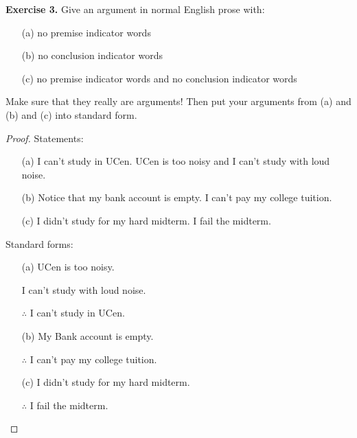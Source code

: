 \documentclass{article}
\begin{document}
\pagebreak

\begin{ques}\label{q3}
\textbf{Exercise 3.} Give an argument in normal English prose with:

\begin{enumerate}
\item[(a)] no premise indicator words
\item[(b)] no conclusion indicator words
\item[(c)] no premise indicator words and no conclusion indicator words
\end{enumerate}

Make sure that they really are arguments! Then put your arguments from (a) and (b) and (c) into standard form.
\end{ques}

\begin{proof}

    Statements:

    \begin{itemize}
        \item[(a)] I can't study in UCen. UCen is too noisy and I can't study with loud noise.
        \item[(b)] Notice that my bank account is empty. I can't pay my college tuition.
        \item[(c)] I didn't study for my hard midterm. I fail the midterm.
    \end{itemize}

    \hfil

    Standard forms:

    \begin{itemize}
        \item[(a)] UCen is too noisy.
        
        I can't study with loud noise.

        $\therefore$ I can't study in UCen.

        \item[(b)] My Bank account is empty.
        
        $\therefore$ I can't pay my college tuition.

        \item[(c)] I didn't study for my hard midterm.
        
        $\therefore$ I fail the midterm.
    \end{itemize}
\end{proof}

\pagebreak
\end{document}
